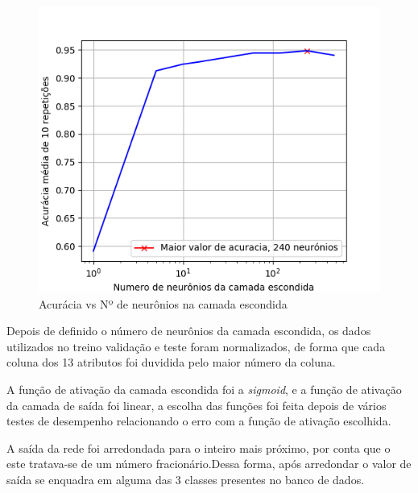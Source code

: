 \begin{figure}[H]
\centering %
\includegraphics[width=\columnwidth]{04-Figuras/acuracia}
\caption{Acurácia vs Nº de neurônios na camada escondida}
\label{figura:acuracia}
\end{figure}

Depois de definido o número de neurônios da camada escondida, os dados utilizados no treino validação e  teste foram normalizados, de forma que cada coluna dos 13 atributos foi duvidida pelo maior número da coluna.

A função de ativação da camada escondida foi a \textit{sigmoid}, e a função de ativação da camada de saída foi linear, a escolha das funções foi feita depois de vários testes de desempenho relacionando o erro com a função de ativação escolhida.

A saída da rede foi arredondada para o inteiro mais próximo, por conta que o este tratava-se de um número fracionário.Dessa forma, após arredondar o valor de saída se enquadra em alguma das 3 classes presentes no banco de dados.
 
